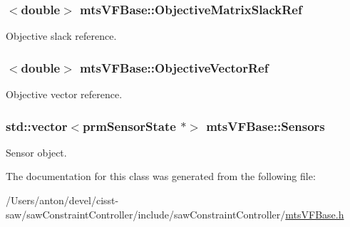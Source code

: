 \subsubsection[{Objective\+Matrix\+Slack\+Ref}]{$<$double$>$ mts\+V\+F\+Base\+::\+Objective\+Matrix\+Slack\+Ref}\label{classmts_v_f_base_a97679c797cd0099833eab17d255be220}


Objective slack reference. 

\hypertarget{classmts_v_f_base_a3eb71862ba4f3e84334626da145500b8}{}
\subsubsection[{Objective\+Vector\+Ref}]{$<$double$>$ mts\+V\+F\+Base\+::\+Objective\+Vector\+Ref}\label{classmts_v_f_base_a3eb71862ba4f3e84334626da145500b8}


Objective vector reference. 

\hypertarget{classmts_v_f_base_aaa45dda5c29d0b4b4b097988fea04ed5}{}
\subsubsection[{Sensors}]{\setlength{\rightskip}{0pt plus 5cm}std\+::vector$<$prm\+Sensor\+State $\ast$$>$ mts\+V\+F\+Base\+::\+Sensors}\label{classmts_v_f_base_aaa45dda5c29d0b4b4b097988fea04ed5}


Sensor object. 



The documentation for this class was generated from the following file\+:\begin{DoxyCompactItemize}
\item 
/\+Users/anton/devel/cisst-\/saw/saw\+Constraint\+Controller/include/saw\+Constraint\+Controller/\hyperlink{mts_v_f_base_8h}{mts\+V\+F\+Base.\+h}\end{DoxyCompactItemize}
